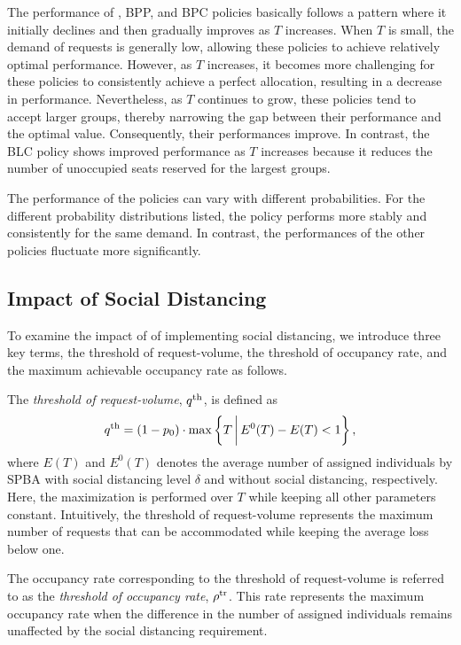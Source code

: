 The performance of , BPP, and BPC policies basically follows a pattern where it initially declines and then gradually improves as $T$ increases. When $T$ is small, the demand of requests is generally low, allowing these policies to achieve relatively optimal performance. However, as $T$ increases, it becomes more challenging for these policies to consistently achieve a perfect allocation, resulting in a decrease in performance. Nevertheless, as $T$ continues to grow, these policies tend to accept larger groups, thereby narrowing the gap between their performance and the optimal value. Consequently, their performances improve. In contrast, the BLC policy shows improved performance as $T$ increases because it reduces the number of unoccupied seats reserved for the largest groups. 

The performance of the policies can vary with different probabilities. For the different probability distributions listed, the  policy performs more stably and consistently for the same demand. In contrast, the performances of the other policies fluctuate more significantly.


\subsection{Impact of Social Distancing}\label{impact_sd}
To examine the impact of of implementing social distancing, we introduce three key terms, the threshold of request-volume, the threshold of occupancy rate, and the maximum achievable occupancy rate as follows.

The \textit{threshold of request-volume}, ${q}^{\textup{th}}$, is defined as 
\[
{q}^{\textup{th}} = (1- p_0) \cdot \max\left\{T \,\bigg|\, E^{0}(T) - E(T) < 1\right\},
\]
where $E(T)$ and $E^{0}(T)$ denotes the average number of assigned individuals by SPBA with social distancing level $\delta$ and without social distancing, respectively. Here, the maximization is performed over $T$ while keeping all other parameters constant.
Intuitively, the threshold of request-volume represents the maximum number of requests that can be accommodated while keeping the average loss below one.


The occupancy rate corresponding to the threshold of request-volume is referred to as the \textit{threshold of occupancy rate}, $\rho^{\textup{tr}}$. This rate represents the maximum occupancy rate when the difference in the number of assigned individuals remains unaffected by the social distancing requirement.

